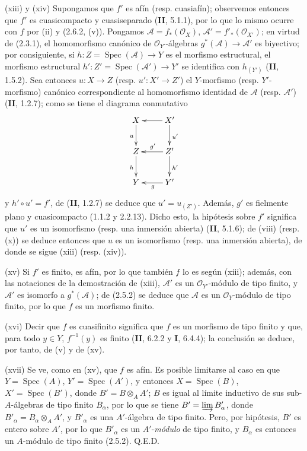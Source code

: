 (xiii) y (xiv) Supongamos que $f'$ es afín (resp. cuasiafín);
observemos entonces que $f'$ es cuasicompacto y cuasiseparado (\textbf{II}, 5.1.1), por
lo que lo mismo ocurre con $f$ por (ii) y (2.6.2, (v)). Pongamos
$\mathcal A=f_*(\mathcal O_X)$, $\mathcal A'=f'_*(\mathcal O_{X'})$; en
virtud de (2.3.1), el homomorfismo canónico de $\mathcal O_{Y'}$-álgebras
$g^*(\mathcal A)\to\mathcal A'$ es biyectivo; por consiguiente, si
$h:Z=\operatorname{Spec}(\mathcal A)\to Y$ es el morfismo estructural, el
morfismo estructural $h':Z'=\operatorname{Spec}(\mathcal A')\to Y'$ se
identifica con $h_{(Y')}$ (\textbf{II}, 1.5.2). Sea entonces $u:X\to Z$ (resp.
$u':X'\to Z'$) el $Y$-morfismo (resp. $Y'$-morfismo) canónico correspondiente
al homomorfismo identidad de $\mathcal A$ (resp. $\mathcal A'$) (\textbf{II}, 1.2.7);
como se tiene el diagrama conmutativo
\[
\xymatrix{
X \ar[d]_{u} & X' \ar[l] \ar[d]^{u'}\\
Z \ar[d]_{h} & Z' \ar[l]_{g'} \ar[d]^{h'}\\
Y & Y' \ar[l]^{g}
}
\]
y $h'\circ u'=f'$, de (\textbf{II}, 1.2.7) se deduce que $u'=u_{(Z')}$. Además, $g'$
es fielmente plano y cuasicompacto (1.1.2 y 2.2.13). Dicho esto, la hipótesis
sobre $f'$ significa que $u'$ es un isomorfismo (resp. una inmersión abierta)
(\textbf{II}, 5.1.6); de (viii) (resp. (x)) se deduce entonces que $u$ es un
isomorfismo (resp. una inmersión abierta), de donde se sigue (xiii) (resp.
(xiv)).

(xv) Si $f'$ es finito, es afín, por lo que también $f$ lo es según
(xiii); además, con las notaciones de la demostración de (xiii), $\mathcal A'$
es un $\mathcal O_{Y'}$-módulo de tipo finito, y $\mathcal A'$ es isomorfo a
$g^*(\mathcal A)$; de (2.5.2) se deduce que $\mathcal A$ es un
$\mathcal O_Y$-módulo de tipo finito, por lo que $f$ es un morfismo finito.

(xvi) Decir que $f$ es cuasifinito significa que $f$ es un morfismo de
tipo finito y que, para todo $y\in Y$, $f^{-1}(y)$ es finito (\textbf{II}, 6.2.2 y \textbf{I},
6.4.4); la conclusión se deduce, por tanto, de (v) y de (xv).

(xvii) Se ve, como en (xv), que $f$ es afín. Es posible limitarse al caso
en que $Y=\operatorname{Spec}(A)$, $Y'=\operatorname{Spec}(A')$, y entonces
$X=\operatorname{Spec}(B)$, $X'=\operatorname{Spec}(B')$, donde
$B'=B\otimes_A A'$; $B$ es igual al límite inductivo de sus
sub-$A$-álgebras de tipo finito $B_\alpha$, por lo que se tiene
$B'=\varinjlim B'_\alpha$, donde $B'_\alpha=B_\alpha\otimes_A A'$, y
$B'_\alpha$ es una $A'$-álgebra de tipo finito. Pero, por hipótesis, $B'$ es
entero sobre $A'$, por lo que $B'_\alpha$ es un $A'$-\emph{módulo} de tipo finito, y
$B_\alpha$ es entonces un $A$-módulo de tipo finito (2.5.2). Q.E.D.
